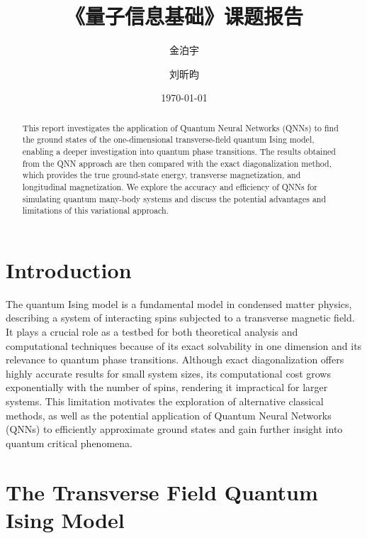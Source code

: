 \documentclass[pre,twocolumn,floatfix]{revtex4-1}
\begin{document}
\title{《量子信息基础》课题报告}

\author{金泊宇}

\author{刘昕昀}


\date{\today}

\begin{abstract}
This report investigates the application of Quantum Neural Networks (QNNs) to find the ground states of the one-dimensional transverse-field quantum Ising model, enabling a deeper investigation into quantum phase transitions. The results obtained from the QNN approach are then compared with the exact diagonalization method, which provides the true ground-state energy, transverse magnetization, and longitudinal magnetization. We explore the accuracy and efficiency of QNNs for simulating quantum many-body systems and discuss the potential advantages and limitations of this variational approach.
\end{abstract}

\maketitle


\section{Introduction} \label{1}%
The quantum Ising model is a fundamental model in condensed matter physics, describing a system of interacting spins subjected to a transverse magnetic field. It plays a crucial role as a testbed for both theoretical analysis and computational techniques because of its exact solvability in one dimension and its relevance to quantum phase transitions. Although exact diagonalization offers highly accurate results for small system sizes, its computational cost grows exponentially with the number of spins, rendering it impractical for larger systems. This limitation motivates the exploration of alternative classical methods, as well as the potential application of Quantum Neural Networks (QNNs) to efficiently approximate ground states and gain further insight into quantum critical phenomena.



\section{The Transverse Field Quantum Ising Model}
\end{document}
